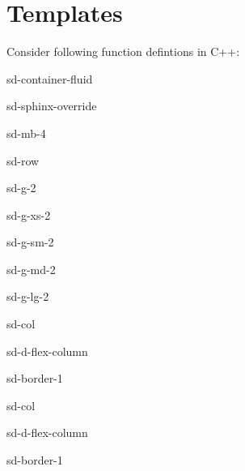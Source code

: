 \documentclass[a4paper,10pt,english]{jupyterBook}
\begin{document}
\chapter{Templates}
\label{\detokenize{text/progtut/templates:templates}}\label{\detokenize{text/progtut/templates::doc}}
\sphinxAtStartPar
Consider following function defintions in C++:

\begin{sphinxuseclass}{sd-container-fluid}
\begin{sphinxuseclass}{sd-sphinx-override}
\begin{sphinxuseclass}{sd-mb-4}
\begin{sphinxuseclass}{sd-row}
\begin{sphinxuseclass}{sd-g-2}
\begin{sphinxuseclass}{sd-g-xs-2}
\begin{sphinxuseclass}{sd-g-sm-2}
\begin{sphinxuseclass}{sd-g-md-2}
\begin{sphinxuseclass}{sd-g-lg-2}
\begin{sphinxuseclass}{sd-col}
\begin{sphinxuseclass}{sd-d-flex-column}
\begin{sphinxuseclass}{sd-border-1}
\begin{sphinxVerbatim}[commandchars=\\\{\}]
\end{sphinxVerbatim}

\end{sphinxuseclass}
\end{sphinxuseclass}
\end{sphinxuseclass}
\begin{sphinxuseclass}{sd-col}
\begin{sphinxuseclass}{sd-d-flex-column}
\begin{sphinxuseclass}{sd-border-1}
\begin{sphinxVerbatim}[commandchars=\\\{\}]
\end{sphinxVerbatim}

\end{sphinxuseclass}
\end{sphinxuseclass}
\end{sphinxuseclass}
\end{sphinxuseclass}
\end{sphinxuseclass}
\end{sphinxuseclass}
\end{sphinxuseclass}
\end{sphinxuseclass}
\end{sphinxuseclass}
\end{sphinxuseclass}
\end{sphinxuseclass}
\end{sphinxuseclass}
\end{document}
